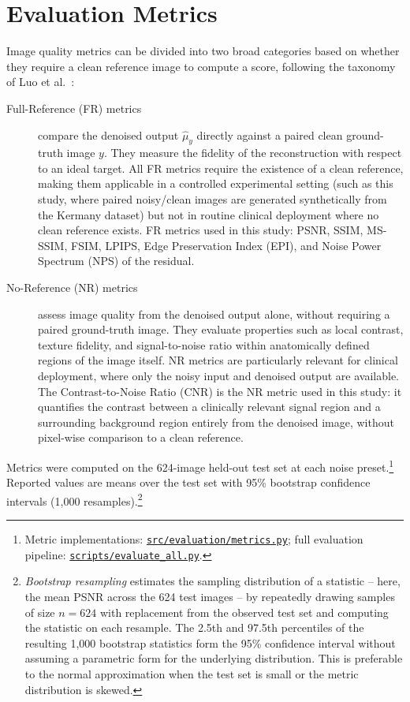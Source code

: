 \documentclass[12pt, a4paper, twoside, openright]{book}
\begin{document}
\section{Evaluation Metrics}
\label{sec:methods:evaluation}

Image quality metrics can be divided into two broad categories based on whether they require a clean reference image to compute a score, following the taxonomy of Luo et al.\ \cite{luo_eedn_2022}:

\begin{description}
  \item[Full-Reference (FR) metrics] compare the denoised output $\hat{\mu}_y$ directly against a paired clean ground-truth image $y$. They measure the fidelity of the reconstruction with respect to an ideal target. All FR metrics require the existence of a clean reference, making them applicable in a controlled experimental setting (such as this study, where paired noisy/clean images are generated synthetically from the Kermany dataset) but not in routine clinical deployment where no clean reference exists. FR metrics used in this study: PSNR, SSIM, MS-SSIM, FSIM, LPIPS, Edge Preservation Index (EPI), and Noise Power Spectrum (NPS) of the residual.

  \item[No-Reference (NR) metrics] assess image quality from the denoised output alone, without requiring a paired ground-truth image. They evaluate properties such as local contrast, texture fidelity, and signal-to-noise ratio within anatomically defined regions of the image itself. NR metrics are particularly relevant for clinical deployment, where only the noisy input and denoised output are available. The Contrast-to-Noise Ratio (CNR) is the NR metric used in this study: it quantifies the contrast between a clinically relevant signal region and a surrounding background region entirely from the denoised image, without pixel-wise comparison to a clean reference.
\end{description}

Metrics were computed on the 624-image held-out test set at each noise preset.\footnote{Metric implementations: \href{https://github.com/teklesam/ppva_hformer_codebase/blob/main/src/evaluation/metrics.py}{\texttt{src/evaluation/metrics.py}}; full evaluation pipeline: \href{https://github.com/teklesam/ppva_hformer_codebase/blob/main/scripts/evaluate_all.py}{\texttt{scripts/evaluate\_all.py}}.} Reported values are means over the test set with 95\% bootstrap confidence intervals (1,000 resamples).\footnote{\emph{Bootstrap resampling} \cite{efron_bootstrap_1979} estimates the sampling distribution of a statistic -- here, the mean PSNR across the 624 test images -- by repeatedly drawing samples of size $n=624$ with replacement from the observed test set and computing the statistic on each resample. The 2.5th and 97.5th percentiles of the resulting 1,000 bootstrap statistics form the 95\% confidence interval without assuming a parametric form for the underlying distribution. This is preferable to the normal approximation when the test set is small or the metric distribution is skewed.}
\end{document}
